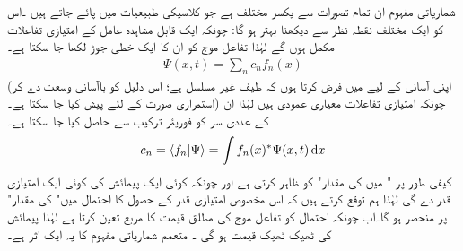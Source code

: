 شماریاتی  مفہوم ان تمام  تصورات  سے یکسر مختلف ہے جو  کلاسیکی طبیعیات میں پائے جاتے ہیں ۔اس کو ایک مختلف نقطہ نظر سے دیکھنا بہتر ہو گا: چونکہ ایک  قابل مشاہدہ عامل کے امتیازی تفاعلات مکمل ہوں گے  لہٰذا تفاعل موج کو ان کا ایک خطی جوڑ لکھا جا سکتا ہے۔
\begin{align}
\Psi(x,t) = \sum_{n} c_{n}f_{n}(x)
\end{align}
(اپنی آسانی کے لیے میں فرض کرتا ہوں کہ طیف غیر مسلسل ہے؛   اس دلیل  کو باآسانی  وسعت دے کر  استمراری صورت کے  لئے پیش کیا جا سکتا ہے۔) چونکہ امتیازی تفاعلات  معیاری عمودی ہیں لہٰذا ان کے عددی سر کو فوریئر   ترکیب سے حاصل کیا جا سکتا ہے۔
\begin{align}\label{مساوات_قواعد_فوریئر_ترکیب_عددی_سر}
c_{n} = \langle f_{n} | \Psi \rangle = \int f_{n}(x)^{*} \Psi(x,t)\dif x
\end{align}
کیفی طور پر " میں  کی مقدار"  کو  ظاہر کرتی ہے اور چونکہ کوئی  ایک  پیمائش  کی کوئی ایک امتیازی قدر دے گی لہٰذا ہم توقع کرتے ہیں کہ اس  مخصوص امتیازی قدر  کے حصول کا احتمال  میں" کی مقدار"  پر منحصر ہو گا۔اب چونکہ احتمال کو تفاعل موج کی مطلق قیمت کا مربع تعین کرتا ہے لہٰذا  پیمائش کی ٹھیک ٹھیک قیمت   ہو گی ۔ متعمم  شماریاتی مفہوم  کا یہ ایک اثر ہے۔

